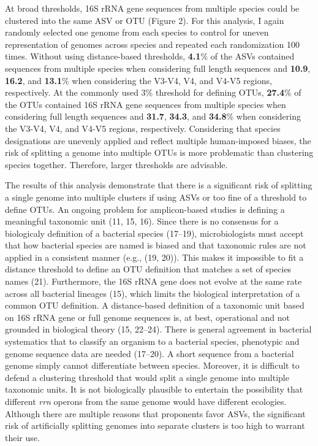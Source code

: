 \documentclass[
]{article}
\begin{document}
At broad thresholds, 16S rRNA gene sequences from multiple species could
be clustered into the same ASV or OTU (Figure 2). For this analysis, I
again randomly selected one genome from each species to control for
uneven representation of genomes across species and repeated each
randomization 100 times. Without using distance-based thresholds,
\textbf{4.1}\% of the ASVs contained sequences from multiple species
when considering full length sequences and \textbf{10.9}, \textbf{16.2},
and \textbf{13.1}\% when considering the V3-V4, V4, and V4-V5 regions,
respectively. At the commonly used 3\% threshold for defining OTUs,
\textbf{27.4}\% of the OTUs contained 16S rRNA gene sequences from
multiple species when considering full length sequences and
\textbf{31.7}, \textbf{34.3}, and \textbf{34.8}\% when considering the
V3-V4, V4, and V4-V5 regions, respectively. Considering that species
designations are unevenly applied and reflect multiple human-imposed
biases, the risk of splitting a genome into multiple OTUs is more
problematic than clustering species together. Therefore, larger
thresholds are advisable.

The results of this analysis demonstrate that there is a significant
risk of splitting a single genome into multiple clusters if using ASVs
or too fine of a threshold to define OTUs. An ongoing problem for
amplicon-based studies is defining a meaningful taxonomic unit (11, 15,
16). Since there is no consensus for a biologicaly definition of a
bacterial species (17--19), microbiologists must accept that how
bacterial species are named is biased and that taxonomic rules are not
applied in a consistent manner (e.g., (19, 20)). This makes it
impossible to fit a distance threshold to define an OTU definition that
matches a set of species names (21). Furthermore, the 16S rRNA gene does
not evolve at the same rate across all bacterial lineages (15), which
limits the biological interpretation of a common OTU definition. A
distance-based definition of a taxonomic unit based on 16S rRNA gene or
full genome sequences is, at best, operational and not grounded in
biological theory (15, 22--24). There is general agreement in bacterial
systematics that to classify an organism to a bacterial species,
phenotypic and genome sequence data are needed (17--20). A short
sequence from a bacterial genome simply cannot differentiate between
species. Moreover, it is difficult to defend a clustering threshold that
would split a single genome into multiple taxonomic units. It is not
biologically plausible to entertain the possibility that different
\emph{rrn} operons from the same genome would have different ecologies.
Although there are multiple reasons that proponents favor ASVs, the
significant risk of artificially splitting genomes into separate
clusters is too high to warrant their use.
\end{document}
